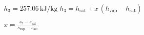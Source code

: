 \( h_3 = 257.06 \, \text{kJ/kg} \)  
\( h_3 = h_{\text{sat}} + x \, (h_{\text{vap}} - h_{\text{sat}}) \)  

\( x = \frac{s_2 - s_{\text{sat}}}{s_{\text{vap}} - s_{\text{sat}}} \)